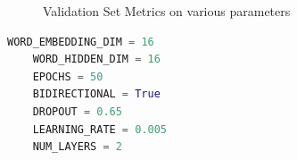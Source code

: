 \begin{figure}[h]
    \caption{Validation Set Metrics on various parameters}
\end{figure}


\begin{lstlisting}[language=Python]
	WORD_EMBEDDING_DIM = 16
	WORD_HIDDEN_DIM = 16
	EPOCHS = 50
	BIDIRECTIONAL = True
	DROPOUT = 0.65
	LEARNING_RATE = 0.005
	NUM_LAYERS = 2
\end{lstlisting}

